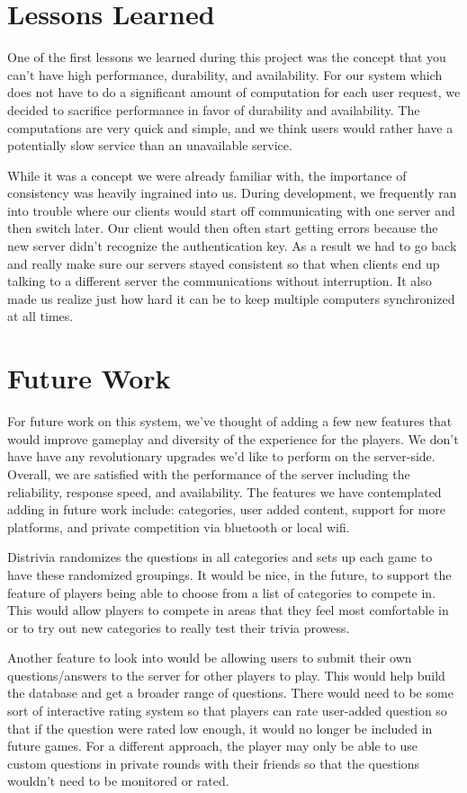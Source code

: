 \documentclass{dependencies/acm_proc_article-sp}
\begin{document}
\section{Lessons Learned}
One of the first lessons we learned during this project was the concept that you can't have high performance, durability, and availability.  For our system which does not have to do a significant amount of computation for each user request, we decided to sacrifice performance in favor of durability and availability.  The computations are very quick and simple, and we think users would rather have a potentially slow service than an unavailable service.  

While it was a concept we were already familiar with, the importance of consistency was heavily ingrained into us.  During development, we frequently ran into trouble where our clients would start off communicating with one server and then switch later.  Our client would then often start getting errors because the new server didn't recognize the authentication key.  As a result we had to go back and really make sure our servers stayed consistent so that when clients end up talking to a different server the communications without interruption.  It also made us realize just how hard it can be to keep multiple computers synchronized at all times.

\section{Future Work}
For future work on this system, we've thought of adding a few new features that would improve gameplay and diversity of the experience for the players.
We don't have have any revolutionary upgrades we'd like to perform on the server-side.
Overall, we are satisfied with the performance of the server including the reliability, response speed, and availability. The features we have contemplated adding in future work include: categories, user added content, support for more platforms, and private competition via bluetooth or local wifi.

Distrivia randomizes the questions in all categories and sets up each game to have these randomized groupings.
It would be nice, in the future, to support the feature of players being able to choose from a list of categories to compete in.
This would allow players to compete in areas that they feel most comfortable in or to try out new categories to really test their trivia prowess.

Another feature to look into would be allowing users to submit their own questions/answers to the server for other players to play.
This would help build the database and get a broader range of questions.
There would need to be some sort of interactive rating system so that players can rate user-added question so that if the question were rated low enough, it would no longer be included in future games.
For a different approach, the player may only be able to use custom questions in private rounds with their friends so that the questions wouldn't need to be monitored or rated.
\end{document}

